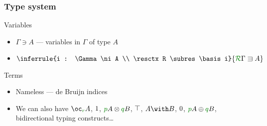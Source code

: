 \documentclass[fleqn]{beamer}
\begin{document}
\begin{frame}
  \frametitle{Type system}
  \begin{block}{Variables}
    \begin{itemize}
      \item $\Gamma \ni A$ --- variables in $\Gamma$ of type $A$
      \item
        \(
        \inferrule
        {i : \Gamma \ni A \\ \resctx R \subres \basis i}
        {\ctx{\Gamma}{R} \lvar A}
        \)
    \end{itemize}
  \end{block}
  \vspace{-1em}
  \begin{block}{Terms}
    \vspace{-2em}
    \vspace{-2em}
  \end{block}
  \begin{itemize}
    \item Nameless --- de Bruijn indices
    \item We can also have
      $\excl{r}{A}$,
      $1{}$, $\tensor{\rescomment pA}{\rescomment qB}$,
      $\top{}$, $\withT{A}{B}$,
      $0{}$, $\sumT{\rescomment pA}{\rescomment qB}$,
      bidirectional typing constructs\ldots
  \end{itemize}
\end{frame}
\end{document}
